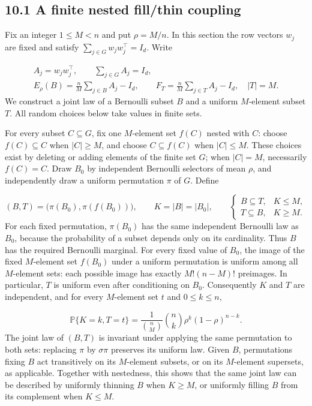 \documentclass[11pt,a4paper]{article}
\begin{document}
\subsection*{10.1 A finite nested fill/thin coupling}
Fix an integer \(1\le M<n\) and put \(\rho=M/n\). In this section the row vectors \(w_j\) are fixed and satisfy \(\sum_{j\in G}w_jw_j^\top=I_d\). Write

\begin{equation}
\begin{aligned}
A_j=w_jw_j^\top,\qquad \sum_{j\in G}A_j=I_d,\\
E_\rho(B)=\frac nM\sum_{j\in B}A_j-I_d,\qquad
F_T=\frac nM\sum_{j\in T}A_j-I_d,
\quad |T|=M.
\end{aligned}
\tag{10.1}
\end{equation}
We construct a joint law of a Bernoulli subset \(B\) and a uniform \(M\)-element subset \(T\). All random choices below take values in finite sets.

For every subset \(C\subseteq G\), fix one \(M\)-element set \(f(C)\) nested with \(C\): choose \(f(C)\subseteq C\) when \(|C|\ge M\), and choose \(C\subseteq f(C)\) when \(|C|\le M\). These choices exist by deleting or adding elements of the finite set \(G\); when \(|C|=M\), necessarily \(f(C)=C\). Draw \(B_0\) by independent Bernoulli selectors of mean \(\rho\), and independently draw a uniform permutation \(\pi\) of \(G\). Define

\begin{equation}
(B,T)=\bigl(\pi(B_0),\pi(f(B_0))\bigr),\qquad
K=|B|=|B_0|,\qquad
\begin{cases}
B\subseteq T,&K\le M,\\
T\subseteq B,&K\ge M.
\end{cases}
\tag{10.2}
\end{equation}
For each fixed permutation, \(\pi(B_0)\) has the same independent Bernoulli law as \(B_0\), because the probability of a subset depends only on its cardinality. Thus \(B\) has the required Bernoulli marginal. For every fixed value of \(B_0\), the image of the fixed \(M\)-element set \(f(B_0)\) under a uniform permutation is uniform among all \(M\)-element sets: each possible image has exactly \(M!(n-M)!\) preimages. In particular, \(T\) is uniform even after conditioning on \(B_0\). Consequently \(K\) and \(T\) are independent, and for every \(M\)-element set \(t\) and \(0\le k\le n\),

\begin{equation}
\mathbb P\{K=k,T=t\}
=\frac{1}{\binom nM}\binom nk\rho^k(1-\rho)^{n-k}.
\tag{10.3}
\end{equation}
The joint law of \((B,T)\) is invariant under applying the same permutation to both sets: replacing \(\pi\) by \(\sigma\pi\) preserves its uniform law. Given \(B\), permutations fixing \(B\) act transitively on its \(M\)-element subsets, or on its \(M\)-element supersets, as applicable. Together with nestedness, this shows that the same joint law can be described by uniformly thinning \(B\) when \(K\ge M\), or uniformly filling \(B\) from its complement when \(K\le M\).
\end{document}
